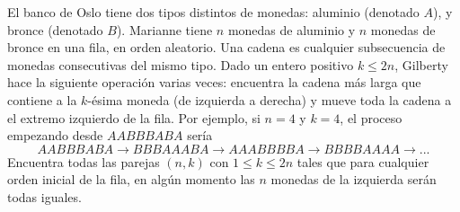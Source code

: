 El banco de Oslo tiene dos tipos distintos de monedas: aluminio (denotado $A$), y bronce (denotado $B$). Marianne tiene $n$ monedas de aluminio y $n$ monedas de bronce en una fila, en orden aleatorio. Una cadena es cualquier subsecuencia de monedas consecutivas del mismo tipo. Dado un entero positivo $k\leq 2n$, Gilberty hace la siguiente operación varias veces: encuentra la cadena más larga que contiene a la $k$-ésima moneda (de izquierda a derecha) y mueve toda la cadena a el extremo izquierdo de la fila. Por ejemplo, si $n=4$ y $k=4$, el proceso empezando desde $AABBBABA$ sería 
\[AABBBABA \to BBBAAABA \to AAABBBBA \to BBBBAAAA \to ...\]
Encuentra todas las parejas $(n,k)$ con $1\leq k\leq2n$ tales que para cualquier orden inicial de la fila, en algún momento las $n$ monedas de la izquierda serán todas iguales.